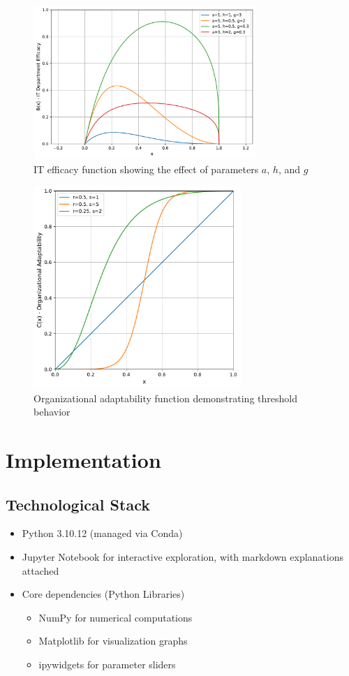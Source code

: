 \documentclass[a4paper, 10pt]{article}
\begin{document}
\begin{figure}[h]
	\centering
	\includegraphics[width=0.75\textwidth]{../images/params/B(x).pdf}
	\caption{IT efficacy function showing the effect of parameters $a$, $h$, and $g$}
\end{figure}

\begin{figure}[h]
	\centering
	\includegraphics[width=0.70\textwidth]{../images/params/C(x).pdf}
	\caption{Organizational adaptability function demonstrating threshold behavior}
\end{figure}

\clearpage
\section{Implementation}
\subsection{Technological Stack}
\begin{itemize}
	\item Python 3.10.12 (managed via Conda)
	\item Jupyter Notebook for interactive exploration, with markdown explanations attached
	\item Core dependencies (Python Libraries)
	      \begin{itemize}
		      \item NumPy for numerical computations
		      \item Matplotlib for visualization graphs
		      \item ipywidgets for parameter sliders
	      \end{itemize}
\end{itemize}
\end{document}
